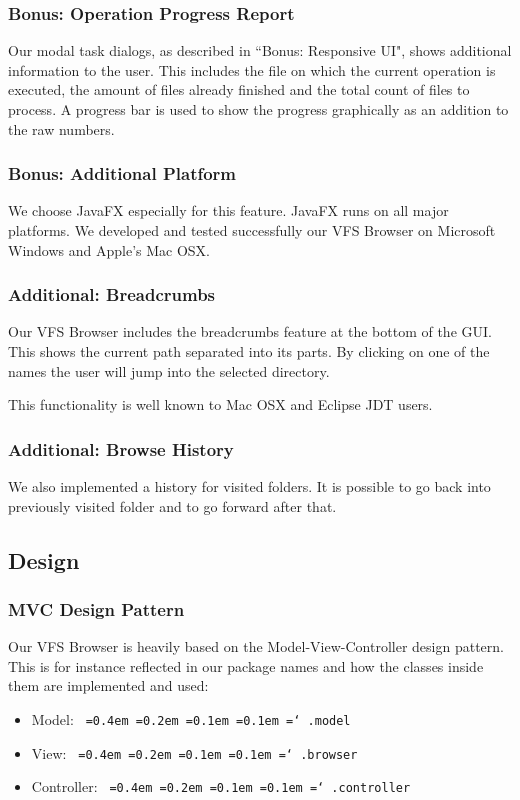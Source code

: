 \documentclass[a4paper,12pt]{article}
\newcommand*\justify{%
  \fontdimen2\font=0.4em%
  \fontdimen3\font=0.2em%
  \fontdimen4\font=0.1em%
  \fontdimen7\font=0.1em%
  \hyphenchar\font=`\-%
}
\newcommand{\mono}[1]{\texttt{\justify #1}}
\begin{document}
\subsubsection{Bonus: Operation Progress Report}
Our modal task dialogs, as described in ``Bonus: Responsive UI", shows additional information to the user. This includes the file on which the current operation is executed, the amount of files already finished and the total count of files to process. A progress bar is used to show the progress graphically as an addition to the raw numbers.

\subsubsection{Bonus: Additional Platform}
We choose JavaFX especially for this feature. JavaFX runs on all major platforms. We developed and tested successfully our VFS Browser on Microsoft Windows and Apple's Mac OSX.

\subsubsection{Additional: Breadcrumbs}
Our VFS Browser includes the breadcrumbs feature at the bottom of the GUI. This shows the current path separated into its parts. By clicking on one of the names the user will jump into the selected directory.

This functionality is well known to Mac OSX and Eclipse JDT users.

\subsubsection{Additional: Browse History}
We also implemented a history for visited folders. It is possible to go back into previously visited folder and to go forward after that.

\subsection{Design}

\subsubsection{MVC Design Pattern}
Our VFS Browser is heavily based on the Model-View-Controller design pattern. This is for instance reflected in our package names and how the classes inside them are implemented and used:
\begin{itemize}
    \item Model: \mono{.model}
    \item View: \mono{.browser}
    \item Controller: \mono{.controller}
\end{itemize}
\end{document}
